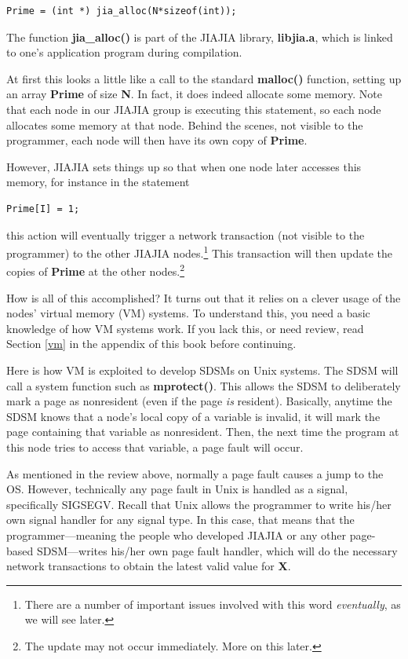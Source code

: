 \begin{Verbatim}[fontsize=\relsize{-2}]
Prime = (int *) jia_alloc(N*sizeof(int));
\end{Verbatim}

The function {\bf jia\_alloc()} is part of the JIAJIA library, {\bf
libjia.a}, which is linked to one's application program during
compilation.

At first this looks a little like a call to the standard {\bf malloc()}
function, setting up an array {\bf Prime} of size {\bf N}.  In fact, it
does indeed allocate some memory.  Note that each node in our JIAJIA
group is executing this statement, so each node allocates some memory at
that node.  Behind the scenes, not visible to the programmer, each node
will then have its own copy of {\bf Prime}.

However, JIAJIA sets things up so that when one node later accesses this
memory, for instance in the statement

\begin{Verbatim}[fontsize=\relsize{-2}]
Prime[I] = 1;
\end{Verbatim}

this action will eventually trigger a network transaction (not visible
to the programmer) to the other JIAJIA nodes.\footnote{There are a
number of important issues involved with this word {\it eventually}, as
we will see later.} This transaction will then update the copies of {\bf
Prime} at the other nodes.\footnote{The update may not occur
immediately.  More on this later.} 

How is all of this accomplished?  It turns out that it relies on a
clever usage of the nodes' virtual memory (VM) systems.  To understand
this, you need a basic knowledge of how VM systems work.  If you lack
this, or need review, read Section \ref{vm} in the appendix of this book
before continuing.

Here is how VM is exploited to develop SDSMs on Unix systems.  The
SDSM will call a system function such as {\bf mprotect()}.  This allows
the SDSM to deliberately mark a page as nonresident (even if the
page {\it is} resident).  Basically, anytime the SDSM knows that a
node's local copy of a variable is invalid, it will mark the page
containing that variable as nonresident.  Then, the next time the
program at this node tries to access that variable, a page fault will
occur. 

As mentioned in the review above, normally a page fault causes a jump to
the OS.  However, technically any page fault in Unix is handled as a
signal, specifically SIGSEGV.  Recall that Unix allows the programmer to
write his/her own signal handler for any signal type.  In this case,
that means that the programmer---meaning the people who developed JIAJIA
or any other page-based SDSM---writes his/her own page fault handler,
which will do the necessary network transactions to obtain the latest
valid value for {\bf X}.

